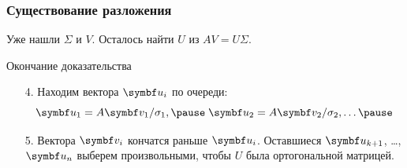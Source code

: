 \begin{frame}
\frametitle{Существование разложения}

Уже нашли $\Sigma$ и $V$. Осталось найти $U$ из $AV = U\Sigma$. \pause

\begin{block}{Окончание доказательства}
\begin{enumerate}

      \item[4.] Находим вектора $\bu_i$ по очереди:
      \[
        \bu_1 = A\bv_1 / \sigma_1, \pause \; \bu_2 = A\bv_2 / \sigma_2, \ldots \pause
      \]
      \item[5.] Вектора $\bv_i$ кончатся раньше $\bu_i$. \pause
      Оставшиеся $\bu_{k+1}$, \ldots, $\bu_{n}$ выберем произвольными, чтобы $U$ была ортогональной матрицей.

\end{enumerate}
\end{block}

  

\end{frame}




